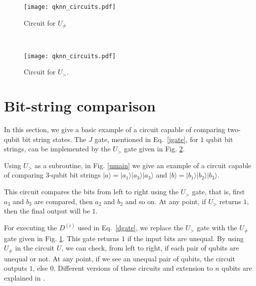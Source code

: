 \documentclass[a4paper,twocolumn,11pt,unpublished]{quantumarticle}
\begin{document}
    \begin{figure*}[t!]
    \centering
    \begin{subfigure}[b]{0.5\textwidth}
        \centering
    \texttt{[image: qknn\_circuits.pdf]}
                \caption{Circuit for $U_{\neq}$}
                \label{U_neq}
    \end{subfigure}%
    ~ 
    \begin{subfigure}[b]{0.5\textwidth}
        \centering
        \texttt{[image: qknn\_circuits.pdf]}
            \caption{Circuit for $U_>$.}
            \label{fig:U_geq}
    \end{subfigure}
    \caption{Circuits used in bitstring comparison.}
\end{figure*}
    
    
    
        
\section{Bit-string comparison} \label{app:bs_comp}
    In this section, we give a basic example of a circuit capable of comparing two-qubit bit string states. The $J$ gate, mentioned in Eq.~\eqref{jgate}, for $1$ qubit bit strings, can be implemented by the $U_{>}$ gate given in Fig. \ref{fig:U_geq}.
    
    Using $U_>$ as a subroutine, in Fig. \ref{umain} we give an example of a circuit capable of comparing $3$-qubit bit strings $|a\rangle = |a_1\rangle |a_3\rangle |a_3\rangle$ and $|b\rangle = |b_1\rangle |b_2\rangle |b_3\rangle$.
    
    This circuit compares the bits from left to right using the $U_{>}$ gate, that is, first $a_3$ and $b_3$ are compared, then $a_2$ and $b_2$ and so on. At any point, if $U_{>}$ returns $1$, then the final output will be $1$.
    
    For executing the $D ^ {(i)}$ used in Eq.~\eqref{dgate}, we replace the $U_{>}$ gate with the $U_{\neq}$ gate given in Fig. \ref{U_neq}. This gate returns $1$ if the input bits are unequal. By using $U_{\neq}$ in the circuit $U$, we can check, from left to right, if each pair of qubits are unequal or not. At any point, if we see an unequal pair of qubits, the circuit outputs $1$, else 0. Different versions of these circuits and extension to $n$ qubits are explained in \cite{Oliveira2006}.


\newpage 
\end{document}
